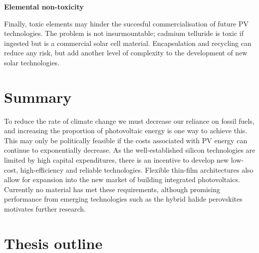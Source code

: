 \textbf{Elemental non-toxicity} 

Finally, toxic elements may hinder the succesful commercialisation of future PV technologies. The problem is not insurmountable; cadmium telluride is toxic if ingested but is a commercial solar cell material. Encapsulation and recycling can reduce any risk, but add another level of complexity to the development of new solar technologies.

\section{Summary}

To reduce the rate of climate change we must decrease our reliance on fossil fuels, and increasing the proportion of photovoltaic energy is one way to achieve this. This may only be politically feasible if the costs associated with PV energy can continue to exponentially decrease. As the well-established silicon technologies are limited by high capital expenditures, there is an incentive to develop new low-cost, high-efficiency and reliable technologies. Flexible thin-film architectures also allow for expansion into the new market of building integrated photovoltaics. Currently no material has met these requirements,\autocite{Zakutayev2017} although promising performance from emerging technologies such as the hybrid halide perovskites motivates further research.




\section{Thesis outline}

